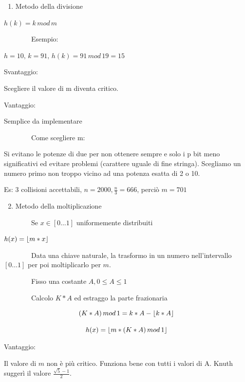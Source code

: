 \documentclass[11pt,a4paper,twoside,openright]{book}
\DeclarePairedDelimiter\floor{\lfloor}{\rfloor}
\providecommand{\tightlist}{\setlength{\itemsep}{0pt}\setlength{\parskip}{0pt}}
\begin{document}
\begin{enumerate}
\tightlist
\item
  {Metodo della divisione}
\end{enumerate}

{}

$h(k) = k\,mod\,m$

{~~~~~~~~Esempio: }

$h=10,\,k=91,\,h(k)=91\,mod\,19=15$

{}

{Svantaggio: }

{Scegliere il valore di m diventa critico. }

{}

{Vantaggio:}

{Semplice da implementare}

{}

{~~~~~~~~Come scegliere m:}

{Si evitano le potenze di due per non ottenere sempre e solo i p bit
meno significativi ed evitare problemi (carattere uguale di fine
stringa). Scegliamo un numero primo non troppo vicino ad una potenza
esatta di 2 o 10.}

{Es: 3 collisioni accettabili, $n=2000,\frac{n}{3}=666$, perciò $m=701$}

\begin{enumerate}
\setcounter{enumi}{1}
\tightlist
\item
  {Metodo della moltiplicazione}
\end{enumerate}

{~~~~~~~~Se $x \in [0\ldots1]$ uniformemente distribuiti}

$h(x) = \floor*{m*x}$

{~~~~~~~~Data una chiave naturale, la trasformo in un numero nell'intervallo $[0\ldots1]$ per poi moltiplicarlo per $m$.}

{~~~~~~~~Fisso una costante $A, 0 \leq A \leq 1$}

{~~~~~~~~Calcolo $K*A$ ed estraggo la parte frazionaria}

\begin{equation}
(K*A)\,mod\,1 = k * A - \floor*{k*A}
\end{equation}

\begin{equation}
h(x) = \floor*{m*(K*A)\,mod\,1}
\end{equation}

{Vantaggio:}

{Il valore di $m$ non è più critico. Funziona bene con tutti i valori di A. Knuth suggerì il valore $\frac{\sqrt{5}-1}{2}$.}
\end{document}
